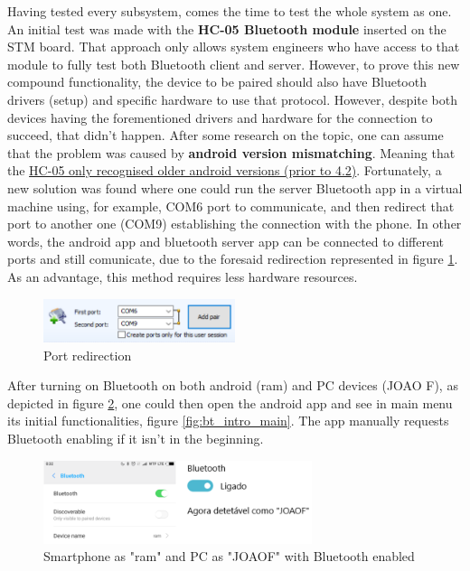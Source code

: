 Having tested every subsystem, comes the time to test the whole system as one.\\
%
An initial test was made with the \textbf{HC-05 Bluetooth module} inserted on the STM board. That approach only allows system engineers who have access to that module to fully test both Bluetooth client and server. 
%
However, to prove this new compound functionality, the device to be paired should also have Bluetooth drivers (setup) and specific hardware to use that protocol.
%
However, despite both devices having the forementioned drivers and hardware for the connection to succeed, that didn't happen. After some research on the topic, one can assume that the problem was caused by \textbf{android version mismatching}. Meaning that the \underline{HC-05 only recognised older android versions (prior to 4.2)}.
%
Fortunately, a new solution was found where one could run the server Bluetooth app in a virtual machine using, for example, COM6 port to communicate, and then redirect that port to another one (COM9) establishing the connection with the phone. In other words, the android app and bluetooth server app can be connected to different ports and still comunicate, due to the foresaid redirection represented in figure \ref{fig:port-red}. As an advantage, this method requires less hardware resources.
%
\begin{figure}[!ht]
\centering
\includegraphics[width=0.5\textwidth]{img/port-red.png}
\caption{\label{fig:port-red}Port redirection}
\end{figure}
%
After turning on Bluetooth on both android (ram) and PC devices (JOAO F), as depicted in figure \ref{fig:bt_app_pc}, one could then open the android app and see in main menu its initial functionalities, figure \ref{fig:bt_intro_main}. The app manually requests Bluetooth enabling if it isn't in the beginning.
%
\begin{figure}[!ht]
\centering
\includegraphics[width=0.7\textwidth]{img/bt_app_pc.png}
\caption{\label{fig:bt_app_pc}Smartphone as "ram" and PC as "JOAOF" with Bluetooth enabled}
\end{figure}
